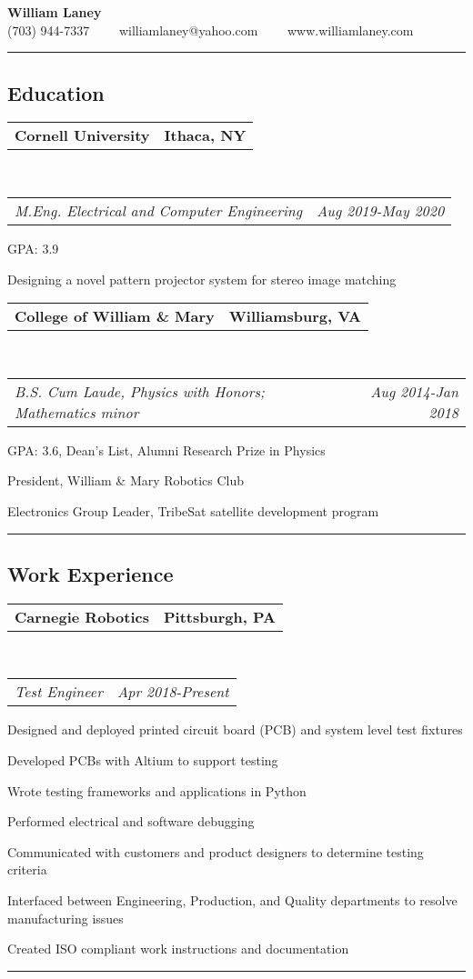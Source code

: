 \documentclass[10pt,letterpaper]{article}
\makeatletter
\newcommand{\headerrow}[2]
{\begin{tabular*}{\linewidth}{l@{\extracolsep{\fill}}r}
	#1 &
	#2 \\
\end{tabular*}}
\makeatother
\begin{document}
\begin{center}
{\LARGE \textbf{William Laney}}\\
\vspace{0.1em}
(703) 944-7337\ \ \textbullet
\ \ williamlaney@yahoo.com\ \ \textbullet
\ \ www.williamlaney.com
\end{center}

\hrule
\vspace{-0.4em}
\subsection*{Education}
	\headerrow
		{\textbf{Cornell University}}
		{\textbf{Ithaca, NY}}
		\\
	\headerrow
		{\emph{M.Eng. Electrical and Computer Engineering}}
		{\emph{Aug 2019-May 2020}}
	\begin{itemize*}
		\item GPA: 3.9
		\item Designing a novel pattern projector system for stereo image matching
	\end{itemize*}
	\headerrow
		{\textbf{College of William \& Mary}}
		{\textbf{Williamsburg, VA}}
	\\
	\headerrow
		{\emph{B.S. Cum Laude, Physics with Honors; Mathematics minor}}
		{\emph{Aug 2014-Jan 2018}}
	\begin{itemize*}
		\item GPA: 3.6, Dean's List, Alumni Research Prize in Physics
		\item President, William \& Mary Robotics Club
		\item Electronics Group Leader, TribeSat satellite development program
	\end{itemize*}


\hrule
\vspace{-0.4em}
\subsection*{Work Experience}
\headerrow
		{\textbf{Carnegie Robotics}}
		{\textbf{Pittsburgh, PA}}
	\\
	\headerrow
		{\emph{Test Engineer}}
		{\emph{Apr 2018-Present}}
	\begin{itemize*}
		\item Designed and deployed printed circuit board (PCB) and system level test fixtures
		\item Developed PCBs with Altium to support testing
		\item Wrote testing frameworks and applications in Python
		\item Performed electrical and software debugging
		\item Communicated with customers and product designers to determine testing criteria
		\item Interfaced between Engineering, Production, and Quality departments to resolve manufacturing issues
		\item Created ISO compliant work instructions and documentation
	\end{itemize*}
\hrule
\vspace{-0.4em}
\end{document}
